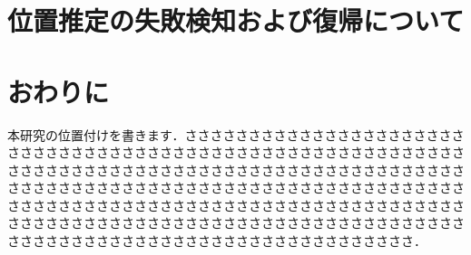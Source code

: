 \section{位置推定の失敗検知および復帰について}

\section{おわりに}
\label{sec:positioning}

本研究の位置付けを書きます．ささささささささささささささささささささささささささささささささささささささささささささささささささささささささささささささささささささささささささささささささささささささささささささささささささささささささささささささささささささささささささささささささささささささささささささささささささささささささささささささささささささささささささささささささささささささささささささささささささささささささささささささささささささささささささささささささささささささささささ．